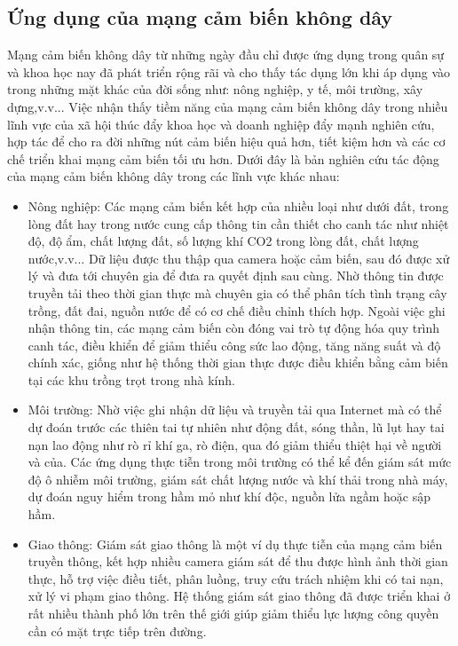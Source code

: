 \subsection{Ứng dụng của mạng cảm biến không dây}
Mạng cảm biến không dây từ những ngày đầu chỉ được ứng dụng trong quân sự và khoa học nay đã phát triển rộng rãi và cho thấy tác dụng lớn khi áp dụng vào trong những mặt khác của đời sống như: nông nghiệp, y tế, môi trường, xây dựng,v.v... Việc nhận thấy tiềm năng của mạng cảm biến không dây trong nhiều lĩnh vực của xã hội thúc đẩy khoa học và doanh nghiệp đẩy mạnh nghiên cứu, hợp tác để cho ra đời những nút cảm biến hiệu quả hơn, tiết kiệm hơn và các cơ chế triển khai mạng cảm biến tối ưu hơn. Dưới đây là bản nghiên cứu tác động của mạng cảm biến không dây trong các lĩnh vực khác nhau:\cite{ramson2017applications}
\begin{itemize}
\item Nông nghiệp: Các mạng cảm biến kết hợp của nhiều loại như dưới đất, trong lòng đất hay trong nước cung cấp thông tin cần thiết cho canh tác như nhiệt độ, độ ẩm, chất lượng đất, số lượng khí CO2 trong lòng đất, chất lượng nước,v.v... Dữ liệu được thu thập qua camera hoặc cảm biến, sau đó được xử lý và đưa tới chuyên gia để đưa ra quyết định sau cùng. Nhờ thông tin được truyền tải theo thời gian thực mà chuyên gia có thể phân tích tình trạng cây trồng, đất đai, nguồn nước để có cơ chế điều chỉnh thích hợp. Ngoài việc ghi nhận thông tin, các mạng cảm biến còn đóng vai trò tự động hóa quy trình canh tác, điều khiển để giảm thiểu công sức lao động, tăng năng suất và độ chính xác, giống như hệ thống thời gian thực được điều khiển bằng cảm biến tại các khu trồng trọt trong nhà kính.
\item Môi trường: Nhờ việc ghi nhận dữ liệu và truyền tải qua Internet mà có thể dự đoán trước các thiên tai tự nhiên như động đất, sóng thần, lũ lụt hay tai nạn lao động như rò rỉ khí ga, rò điện, qua đó giảm thiểu thiệt hại về người và của. Các ứng dụng thực tiễn trong môi trường có thể kể đến giám sát mức độ ô nhiễm môi trường, giám sát chất lượng nước và khí thải trong nhà máy, dự đoán nguy hiểm trong hầm mỏ như khí độc, nguồn lửa ngầm hoặc sập hầm. 
\item Giao thông: Giám sát giao thông là một ví dụ thực tiễn của mạng cảm biến truyền thông, kết hợp nhiều camera giám sát để thu được hình ảnh thời gian thực, hỗ trợ việc điều tiết, phân luồng, truy cứu trách nhiệm khi có tai nạn, xử lý vi phạm giao thông. Hệ thống giám sát giao thông đã được triển khai ở rất nhiều thành phố lớn trên thế giới giúp giảm thiểu lực lượng công quyền cần có mặt trực tiếp trên đường. 

\end{itemize}
